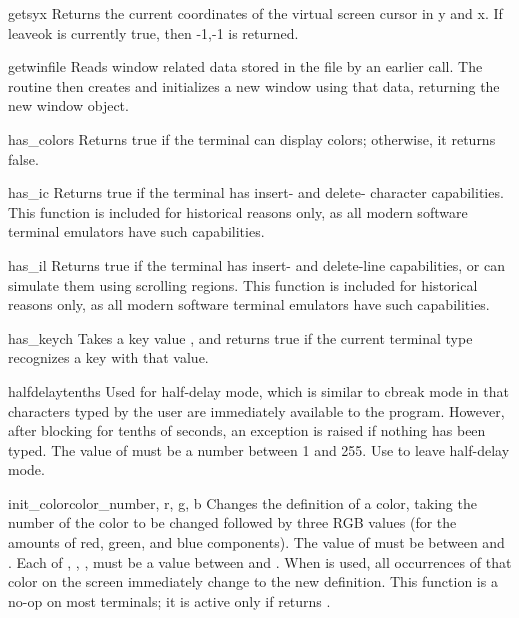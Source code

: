 \begin{funcdesc}{getsyx}{}
Returns the current coordinates of the virtual screen cursor in y and
x.  If leaveok is currently true, then -1,-1 is returned.
\end{funcdesc}

\begin{funcdesc}{getwin}{file}
Reads window related data stored in the file by an earlier
 call.  The routine then creates and initializes a
new window using that data, returning the new window object.
\end{funcdesc}

\begin{funcdesc}{has_colors}{}
Returns true if the terminal can display colors; otherwise, it
returns false. 
\end{funcdesc}

\begin{funcdesc}{has_ic}{}
Returns true if the terminal has insert- and delete- character
capabilities.  This function is included for historical reasons only,
as all modern software terminal emulators have such capabilities.
\end{funcdesc}

\begin{funcdesc}{has_il}{}
Returns true if the terminal has insert- and
delete-line  capabilities,  or  can  simulate  them  using
scrolling regions. This function is included for historical reasons only,
as all modern software terminal emulators have such capabilities.
\end{funcdesc}

\begin{funcdesc}{has_key}{ch}
Takes a key value , and returns true if the current terminal
type recognizes a key with that value.
\end{funcdesc}

\begin{funcdesc}{halfdelay}{tenths}
Used for half-delay mode, which is similar to cbreak mode in that
characters typed by the user are immediately available to the program.
However, after blocking for  tenths of seconds, an
exception is raised if nothing has been typed.  The value of
 must be a number between 1 and 255.  Use
 to leave half-delay mode.
\end{funcdesc}

\begin{funcdesc}{init_color}{color_number, r, g, b}
Changes the definition of a color, taking the number of the color to
be changed followed by three RGB values (for the amounts of red,
green, and blue components).  The value of  must be
between  and .  Each of , ,
, must be a value between  and .  When
 is used, all occurrences of that color on the
screen immediately change to the new definition.  This function is a
no-op on most terminals; it is active only if
 returns .
\end{funcdesc}

